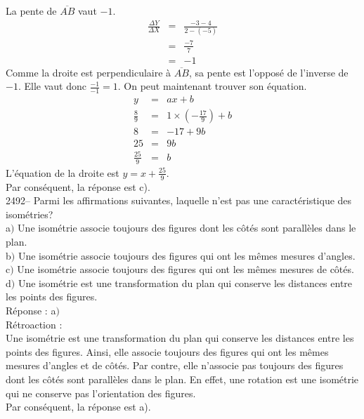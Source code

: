 \documentclass[letterpaper, 12pt]{article}
\begin{document}
La pente de $\overline{AB}$ vaut $-1$.
\begin{eqnarray*}
 \frac{\Delta Y}{\Delta X}&=&\frac{-3-4}{2-(-5)}\\[2mm]
&=&\frac{-7}{7}\\[2mm]
&=&-1
\end{eqnarray*}
Comme la droite est perpendiculaire \`a $\overline{AB}$, sa pente est l'oppos\'e de l'inverse de $-1$. Elle vaut donc $\frac{-1}{-1}=1$. On peut maintenant trouver son \'equation.
\begin{eqnarray*}
 y&=&ax+b\\
 \frac{8}{9}&=&1\times \left( -\frac{17}{9}\right) +b\\[2mm]
 8&=&-17+9b\\[2mm]
 25&=&9b\\[2mm]
\frac{25}{9}&=&b
\end{eqnarray*}
L'\'equation de la droite est $y=x+\frac{25}{9}$.\\
Par cons\'equent, la r\'eponse est c).\\




2492-- Parmi les affirmations suivantes, laquelle n'est pas une caract\'eristique des isom\'etries?\\

a$)$  Une isom\'etrie associe toujours des figures dont les c\^ot\'es sont parall\`eles dans le plan.\\
b$)$  Une isom\'etrie associe toujours des figures qui ont les m\^emes mesures d'angles.\\
c$)$  Une isom\'etrie associe toujours des figures qui ont les m\^emes mesures de c\^ot\'es.\\
d$)$  Une isom\'etrie est une transformation du plan qui conserve les distances entre les points des figures. \\

R\'eponse : a$)$ \\

R\'etroaction :\\
Une isom\'etrie est une transformation du plan qui conserve les distances entre les points des figures. Ainsi, elle associe toujours des figures qui ont les m\^emes mesures d'angles et de c\^ot\'es. Par contre, elle n'associe pas toujours des figures dont les c\^ot\'es sont parall\`eles dans le plan. En effet, une rotation est une isom\'etrie qui ne conserve pas l'orientation des figures.\\
Par cons\'equent, la r\'eponse est a).\\
\end{document}
